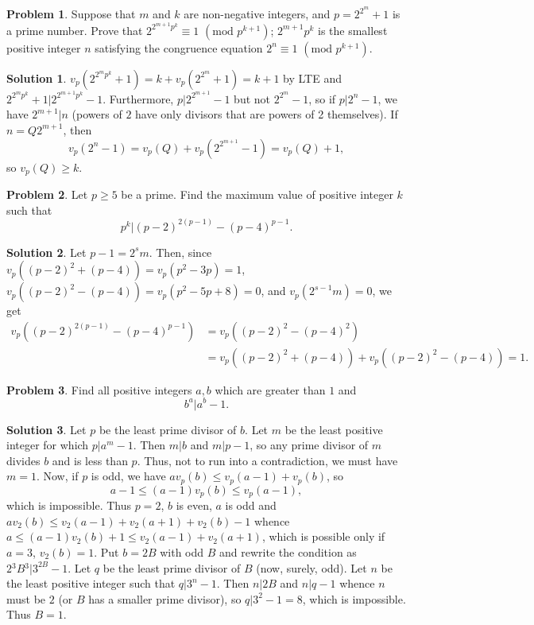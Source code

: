 \documentclass{article}
\theoremstyle{definition}
\newtheorem{problem}{Problem}
\newtheorem*{solution}{Solution}
\begin{document}
\begin{problem}
Suppose that $m$ and $k$ are non-negative integers, and $p = 2^{2^m}+1$ is a prime number. Prove that
$2^{2^{m+1}p^k} \equiv 1$ $(\text{mod } p^{k+1})$;
$2^{m+1}p^k$ is the smallest positive integer $n$ satisfying the congruence equation $2^n \equiv 1$ $(\text{mod } p^{k+1})$.
\end{problem}

\begin{solution}
$v_p(2^{2^mp^k}+1)=k+v_p(2^{2^m}+1)=k+1$ by LTE and $2^{2^mp^k}+1|2^{2^{m+1}p^k}-1$.
Furthermore, $p|2^{2^{m+1}}-1$ but not $2^{2^m}-1$, so if $p|2^n-1$, we have $2^{m+1}|n$ (powers of $2$ have only divisors that are powers of 2 themselves). If $n=Q2^{m+1}$, then $$v_p(2^n-1)=v_p(Q)+v_p(2^{2^{m+1}}-1)=v_p(Q)+1,$$ so $v_p(Q)\ge k$.
\end{solution}

\begin{problem}
Let $p \geq 5$ be a prime. Find the maximum value of positive integer $k$ such that
$$p^{k}|(p-2)^{2(p-1)}-(p-4)^{p-1}.$$
\end{problem}

\begin{solution}
Let $p-1=2^sm$. Then, since $v_p((p-2)^2+(p-4))=v_p(p^2-3p)=1$, $v_p((p-2)^2-(p-4))=v_p(p^2-5p+8)=0$, and $v_p(2^{s-1}m)=0$, we get
\begin{align*}
    v_p((p-2)^{2(p-1)}-(p-4)^{p-1}) &=v_p((p-2)^{2}-(p-4)^{2})\\
    &=v_p((p-2)^2+(p-4))+v_p((p-2)^2-(p-4))=1.
\end{align*}
\end{solution}

\begin{problem}
Find all positive integers $a,b$ which are greater than $1$ and
$$b^a | a^b-1.$$
\end{problem}

\begin{solution}
Let $p$ be the least prime divisor of $b$. Let $m$ be the least positive integer for which $p|a^m-1$. Then $m|b$ and $m|p-1$, so any prime divisor of $m$ divides $b$ and is less than $p$. Thus, not to run into a contradiction, we must have $m=1$. Now, if $p$ is odd, we have $av_p(b)\le v_p(a-1)+v_p(b)$, so $$a-1\le (a-1)v_p(b)\le v_p(a-1),$$ which is impossible. Thus $p=2$, $b$ is even, $a$ is odd and $av_2(b)\le v_2(a-1)+v_2(a+1)+v_2(b)-1$ whence $a\le (a-1)v_2(b)+1\le v_2(a-1)+v_2(a+1)$, which is possible only if $a=3$, $v_2(b)=1$. Put $b=2B$ with odd $B$ and rewrite the condition as $2{}^3B{}^3|3^{2B}-1$. Let $q$ be the least prime divisor of $B$ (now, surely, odd). Let $n$ be the least positive integer such that $q|3^n-1$. Then $n|2B$ and $n|q-1$ whence $n$ must be $2$ (or $B$ has a smaller prime divisor), so $q|3^2-1=8$, which is impossible. Thus $B=1$. 
\end{solution}
\end{document}
